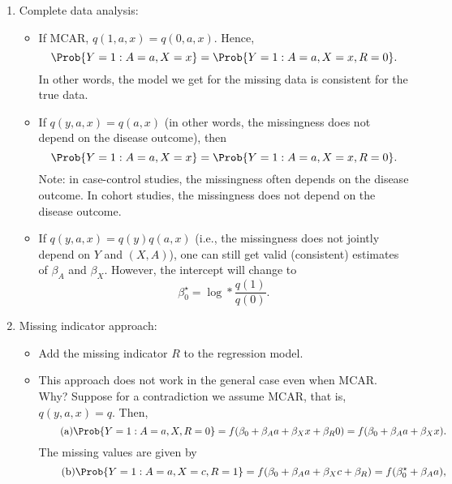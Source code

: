 \begin{enumerate}
      \item Complete data analysis:
            \begin{itemize}
                  \item If MCAR, $ q(1,a,x)=q(0,a,x) $. Hence,
                        \[ \Prob{Y=1\given A=a,X=x}=\Prob{Y=1\given A=a,X=x,R=0}. \]
                        In other words, the model we get for the missing data is consistent for the true data.
                  \item If $ q(y,a,x)=q(a,x) $ (in other words, the missingness does not depend on the disease outcome), then
                        \[ \Prob{Y=1\given A=a,X=x}=\Prob{Y=1\given A=a,X=x,R=0}. \]
                        Note: in case-control studies, the missingness often depends on the disease outcome.
                        In cohort studies, the missingness does not depend on the disease outcome.
                  \item If $ q(y,a,x)=q(y)q(a,x) $ (i.e., the missingness does not jointly depend on $Y$ and $(X,A)$),
                        one can still get valid (consistent) estimates of $ \beta_A $ and $ \beta_X $. However,
                        the intercept will change to
                        \[ \beta_0^\star=\log*{\frac{q(1)}{q(0)}}. \]
            \end{itemize}
      \item Missing indicator approach:
            \begin{itemize}
                  \item Add the missing indicator $ R $ to the regression model.
                  \item This approach does not work in the general case even when
                        MCAR\@. Why? Suppose for a contradiction we assume MCAR, that is,
                        $ q(y,a,x)=q $. Then,
                        \begin{equation}\label{inda}\tag*{(a)}
                              \Prob{Y=1\given A=a,X,R=0}=f(\beta_0+\beta_A a+\beta_X x+\beta_R 0)=
                              f(\beta_0+\beta_A a+\beta_X x).
                        \end{equation}
                        The missing values are given by
                        \begin{equation}\label{indb}\tag*{(b)}
                              \Prob{Y=1\given A=a,X=c,R=1}=f(\beta_0+\beta_A a+\beta_X c+\beta_R)=f(\beta_0^\star+\beta_A a),
                        \end{equation}

\end{itemize}
\end{enumerate}
